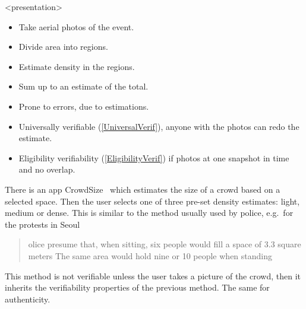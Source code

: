 \begin{frame}<presentation>
  \begin{solution}
    \begin{itemize}
      \item Take aerial photos of the event.
      \item Divide area into regions.
      \item Estimate density in the regions.
      \item Sum up to an estimate of the total.
    \end{itemize}
  \end{solution}

  \pause

  \begin{remark}
    \begin{itemize}
      \item Prone to errors, due to estimations.
      \item Universally verifiable (\cref{UniversalVerif}), anyone with the 
        photos can redo the estimate.
      \item Eligibility verifiability (\cref{EligibilityVerif}) if photos at 
        one snapshot in time and no overlap.
    \end{itemize}
  \end{remark}
\end{frame}

There is an app CrowdSize~\cite{CrowdSize} which estimates the size of a crowd 
based on a selected space.
Then the user selects one of three pre-set density estimates: light, medium or 
dense.
This is similar to the method usually used by police, e.g.\ for the protests in
Seoul
\blockcquote{2016DemonstrationsInSeoul}{%
  olice presume that, when sitting, six people would 
  fill a space of 
  3.3 square meters
  \textelp{}
  The same area would hold nine or 10 people when standing%
}.
This method is not verifiable unless the user takes a picture of the crowd, 
then it inherits the verifiability properties of the previous method.
The same for authenticity.

